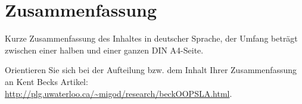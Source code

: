 \chapter*{Zusammenfassung}
Kurze Zusammenfassung des Inhaltes in deutscher Sprache, der Umfang beträgt zwischen einer halben und einer ganzen DIN A4-Seite.

Orientieren Sie sich bei der Aufteilung bzw. dem Inhalt Ihrer Zusammenfassung an Kent Becks Artikel: \url{http://plg.uwaterloo.ca/~migod/research/beckOOPSLA.html}.